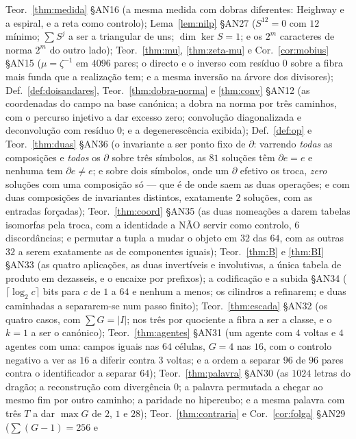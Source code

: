 \documentclass[11pt,a4paper]{article}
\newcommand{\abs}[1]{\lvert #1\rvert}
\begin{document}
{Teor.~\ref{thm:medida} §AN16 (a mesma medida com dobras diferentes: Heighway e
a espiral, e a reta como controlo);
Lema~\ref{lem:nilp} §AN27 ($S^{12}=0$ com $12$ mínimo; $\sum S^j$ a ser a
triangular de uns; $\dim\ker S=1$; e os $2^{m}$ caracteres de norma $2^{m}$ do outro
lado);
Teor.~\ref{thm:mu}, \ref{thm:zeta-mu} e Cor.~\ref{cor:mobius} §AN15
($\mu=\zeta^{-1}$ em $4096$ pares; o directo e o inverso com resíduo $0$ sobre a
fibra mais funda que a realização tem; e a mesma inversão na árvore dos
divisores);
Def.~\ref{def:doisandares}, Teor.~\ref{thm:dobra-norma} e \ref{thm:conv} §AN12
(as coordenadas do campo na base canónica; a dobra na norma por três caminhos,
com o percurso injetivo a dar excesso zero; convolução diagonalizada e
deconvolução com resíduo $0$; e a degenerescência exibida);
Def.~\ref{def:op} e Teor.~\ref{thm:duas} §AN36 (o invariante a ser ponto fixo de
$\partial$: varrendo \emph{todas} as composições e \emph{todos} os $\partial$
sobre três símbolos, as $81$ soluções têm $\partial e=e$ e nenhuma tem
$\partial e\neq e$; e sobre dois símbolos, onde um $\partial$ efetivo os troca,
\emph{zero} soluções com uma composição só --- que é de onde saem as duas
operações; e com duas composições de invariantes distintos, exatamente $2$
soluções, com as entradas forçadas);
Teor.~\ref{thm:coord} §AN35 (as duas nomeações a darem tabelas isomorfas pela
troca, com a identidade a NÃO servir como controlo, $6$ discordâncias; e
permutar a tupla a mudar o objeto em $32$ das $64$, com as outras $32$ a serem
exatamente as de componentes iguais);
Teor.~\ref{thm:B} e \ref{thm:BI} §AN33 (as quatro aplicações, as duas
invertíveis e involutivas, a única tabela de produto em dezasseis, e o encaixe
por prefixos);
a codificação e a subida §AN34 ($\lceil\log_2 c\rceil$ bits para $c$ de $1$ a
$64$ e nenhum a menos; os cilindros a refinarem; e duas caminhadas a separarem-se
num passo finito);
Teor.~\ref{thm:escada} §AN32 (os quatro casos, com $\sum G=\abs{I}$; nos três
por quociente a fibra a ser a classe, e o $k=1$ a ser o canónico);
Teor.~\ref{thm:agentes} §AN31 (um agente com $4$ voltas e $4$ agentes com uma:
campos iguais nas $64$ células, $G=4$ nas $16$, com o controlo negativo a ver as
$16$ a diferir contra $3$ voltas; e a ordem a separar $96$ de $96$ pares contra
o identificador a separar $64$);
Teor.~\ref{thm:palavra} §AN30 (as $1024$ letras do dragão; a reconstrução com
divergência $0$; a palavra permutada a chegar ao mesmo fim por outro caminho; a
paridade no hipercubo; e a mesma palavra com três $T$ a dar $\max G$ de $2$, $1$
e $28$);
Teor.~\ref{thm:contraria} e Cor.~\ref{cor:folga} §AN29 ($\sum(G-1)=256$ e
}
\end{document}
